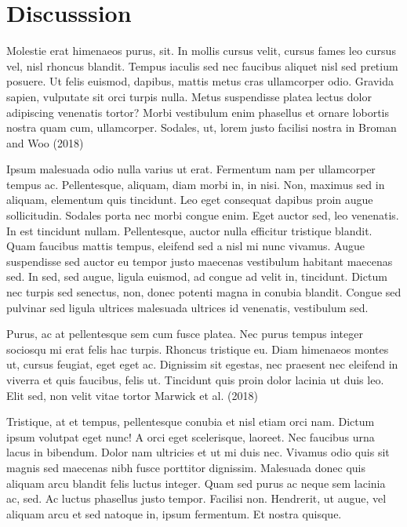 \documentclass[11pt,]{report}
\begin{document}
\hypertarget{discusssion}{%
\chapter{Discusssion}\label{discusssion}}

Molestie erat himenaeos purus, sit. In mollis cursus velit, cursus fames
leo cursus vel, nisl rhoncus blandit. Tempus iaculis sed nec faucibus
aliquet nisl sed pretium posuere. Ut felis euismod, dapibus, mattis
metus cras ullamcorper odio. Gravida sapien, vulputate sit orci turpis
nulla. Metus suspendisse platea lectus dolor adipiscing venenatis
tortor? Morbi vestibulum enim phasellus et ornare lobortis nostra quam
cum, ullamcorper. Sodales, ut, lorem justo facilisi nostra in Broman and
Woo (2018)

Ipsum malesuada odio nulla varius ut erat. Fermentum nam per ullamcorper
tempus ac. Pellentesque, aliquam, diam morbi in, in nisi. Non, maximus
sed in aliquam, elementum quis tincidunt. Leo eget consequat dapibus
proin augue sollicitudin. Sodales porta nec morbi congue enim. Eget
auctor sed, leo venenatis. In est tincidunt nullam. Pellentesque, auctor
nulla efficitur tristique blandit. Quam faucibus mattis tempus, eleifend
sed a nisl mi nunc vivamus. Augue suspendisse sed auctor eu tempor justo
maecenas vestibulum habitant maecenas sed. In sed, sed augue, ligula
euismod, ad congue ad velit in, tincidunt. Dictum nec turpis sed
senectus, non, donec potenti magna in conubia blandit. Congue sed
pulvinar sed ligula ultrices malesuada ultrices id venenatis, vestibulum
sed.

Purus, ac at pellentesque sem cum fusce platea. Nec purus tempus integer
sociosqu mi erat felis hac turpis. Rhoncus tristique eu. Diam himenaeos
montes ut, cursus feugiat, eget eget ac. Dignissim sit egestas, nec
praesent nec eleifend in viverra et quis faucibus, felis ut. Tincidunt
quis proin dolor lacinia ut duis leo. Elit sed, non velit vitae tortor
Marwick et al. (2018)

Tristique, at et tempus, pellentesque conubia et nisl etiam orci nam.
Dictum ipsum volutpat eget nunc! A orci eget scelerisque, laoreet. Nec
faucibus urna lacus in bibendum. Dolor nam ultricies et ut mi duis nec.
Vivamus odio quis sit magnis sed maecenas nibh fusce porttitor
dignissim. Malesuada donec quis aliquam arcu blandit felis luctus
integer. Quam sed purus ac neque sem lacinia ac, sed. Ac luctus
phasellus justo tempor. Facilisi non. Hendrerit, ut augue, vel aliquam
arcu et sed natoque in, ipsum fermentum. Et nostra quisque.
\end{document}
